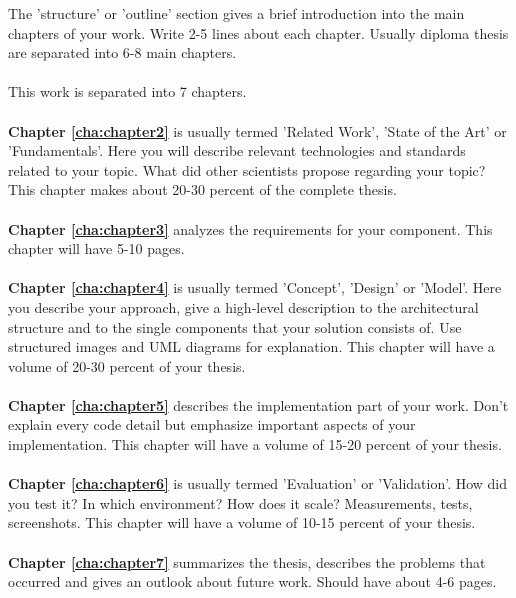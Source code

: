 The 'structure' or 'outline' section gives a brief introduction into the main chapters of your work. Write 2-5 lines about each chapter. Usually diploma thesis are separated into 6-8 main chapters. 
\\
\\
\noindent This work is separated into 7 chapters.
\\
\\
\textbf{Chapter \ref{cha:chapter2}} is usually termed 'Related Work', 'State of the Art' or 'Fundamentals'. Here you will describe relevant technologies and standards related to your topic. What did other scientists propose regarding your topic? This chapter makes about 20-30 percent of the complete thesis.
\\
\\
\textbf{Chapter \ref{cha:chapter3}} analyzes the requirements for your component. This chapter will have 5-10 pages.
\\
\\
\textbf{Chapter \ref{cha:chapter4}} is usually termed 'Concept', 'Design' or 'Model'. Here you describe your approach, give a high-level description to the architectural structure and to the single components that your solution consists of. Use structured images and UML diagrams for explanation. This chapter will have a volume of 20-30 percent of your thesis.
\\
\\
\textbf{Chapter \ref{cha:chapter5}} describes the implementation part of your work. Don't explain every code detail but emphasize important aspects of your implementation. This chapter will have a volume of 15-20 percent of your thesis.
\\
\\
\textbf{Chapter \ref{cha:chapter6}} is usually termed 'Evaluation' or 'Validation'. How did you test it? In which environment? How does it scale? Measurements, tests, screenshots. This chapter will have a volume of 10-15 percent of your thesis.
\\
\\
\textbf{Chapter \ref{cha:chapter7}} summarizes the thesis, describes the problems that occurred and gives an outlook about future work. Should have about 4-6 pages.